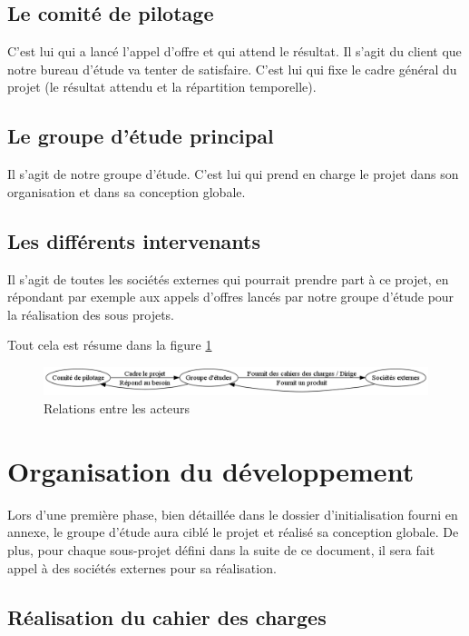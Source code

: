 \documentclass[a4paper, 11pt, draft]{report}
\begin{document}
\subsection{Le comité de pilotage}

C'est lui qui a lancé l'appel d'offre et qui attend le résultat. Il s'agit du client que notre bureau d'étude va tenter de satisfaire. C'est lui qui fixe le cadre général du projet (le résultat attendu et la répartition temporelle).

\subsection{Le groupe d'étude principal}

Il s'agit de notre groupe d'étude. C'est lui qui prend en charge le projet dans son organisation et dans sa conception globale.

\subsection{Les différents intervenants}

Il s'agit de toutes les sociétés externes qui pourrait prendre part à ce projet, en répondant par exemple aux appels d'offres lancés par notre groupe d'étude pour la réalisation des sous projets.

 Tout cela est résume dans la figure \ref{glops2}


\begin{figure}[htbp]
\begin{center}
\includegraphics[width=\textwidth]{relations.png}
\caption{Relations entre les acteurs\label{glops2}}
\end{center}
\end{figure}
\section{Organisation du développement}

Lors d'une première phase, bien détaillée dans le dossier d'initialisation fourni en annexe, le groupe d'étude aura ciblé le projet et réalisé sa conception globale. De plus, pour chaque sous-projet défini dans la suite de ce document, il sera fait appel à des sociétés externes pour sa réalisation.


\subsection{Réalisation du cahier des charges}
\end{document}

